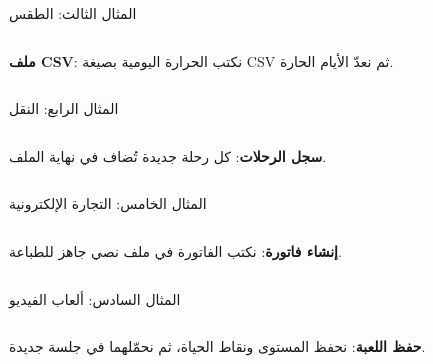 \documentclass[aspectratio=169, 11pt, t, xcolor={table}]{beamer}
\begin{document}
\begin{frame}[t]{المثال الثالث: الطقس}
    \begin{columns}[T]
        {\small \textbf{ملف \textenglish{CSV}}: نكتب الحرارة اليومية بصيغة \textenglish{CSV} ثم نعدّ الأيام الحارة.\par}
        \vspace{0.3cm}
    \end{columns}
\end{frame}

\begin{frame}[t]{المثال الرابع: النقل}
    \begin{columns}[T]
        {\small \textbf{سجل الرحلات}: كل رحلة جديدة تُضاف في نهاية الملف.\par}
        \vspace{0.3cm}
    \end{columns}
\end{frame}

\begin{frame}[t]{المثال الخامس: التجارة الإلكترونية}
    \begin{columns}[T]
        {\small \textbf{إنشاء فاتورة}: نكتب الفاتورة في ملف نصي جاهز للطباعة.\par}
        \vspace{0.3cm}
    \end{columns}
\end{frame}

\begin{frame}[t]{المثال السادس: ألعاب الفيديو}
    \begin{columns}[T]
        {\small \textbf{حفظ اللعبة}: نحفظ المستوى ونقاط الحياة، ثم نحمّلهما في جلسة جديدة.\par}
        \vspace{0.3cm}
    \end{columns}
\end{frame}
\end{document}
